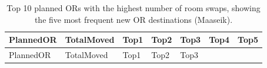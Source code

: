 \documentclass[
]{article}
\begin{document}
\begin{longtable}[]{@{}
  >{\centering\arraybackslash}p{}
  >{\centering\arraybackslash}p{}
  >{\centering\arraybackslash}p{}
  >{\centering\arraybackslash}p{}
  >{\centering\arraybackslash}p{}
  >{\centering\arraybackslash}p{}
  >{\centering\arraybackslash}p{}@{}}
\caption{Top 10 planned ORs with the highest number of room swaps,
showing the five most frequent new OR destinations (Maaseik).
\label{tab:room_swap_or}}\tabularnewline
\toprule\noalign{}
\begin{minipage}[b]{\linewidth}\centering
PlannedOR
\end{minipage} & \begin{minipage}[b]{\linewidth}\centering
TotalMoved
\end{minipage} & \begin{minipage}[b]{\linewidth}\centering
Top1
\end{minipage} & \begin{minipage}[b]{\linewidth}\centering
Top2
\end{minipage} & \begin{minipage}[b]{\linewidth}\centering
Top3
\end{minipage} & \begin{minipage}[b]{\linewidth}\centering
Top4
\end{minipage} & \begin{minipage}[b]{\linewidth}\centering
Top5
\end{minipage} \\
\midrule\noalign{}
\endfirsthead
\toprule\noalign{}
\begin{minipage}[b]{\linewidth}\centering
PlannedOR
\end{minipage} & \begin{minipage}[b]{\linewidth}\centering
TotalMoved
\end{minipage} & \begin{minipage}[b]{\linewidth}\centering
Top1
\end{minipage} & \begin{minipage}[b]{\linewidth}\centering
Top2
\end{minipage} & \begin{minipage}[b]{\linewidth}\centering
Top3
\end{minipage} & \begin{minipage}[b]{\linewidth}\centering

\end{minipage}
\end{longtable}
\end{document}
